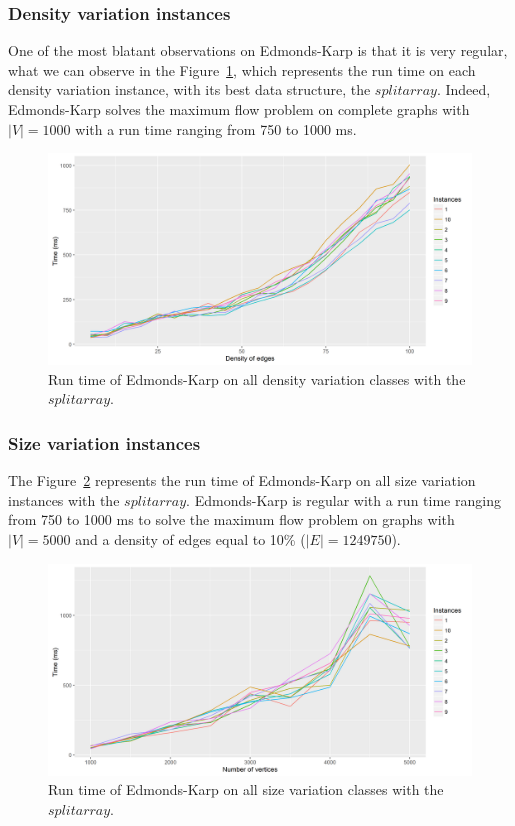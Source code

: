 \subsubsection{Density variation instances}
One of the most blatant observations on Edmonds-Karp is that it is very regular, what we can observe in the Figure~\ref{fig:EKmean}, which represents the run time on each density variation instance, with its best data structure, the $split array$. Indeed, Edmonds-Karp solves the maximum flow problem on complete graphs with $|V|=1000$ with a run time ranging from 750 to 1000 ms.
\begin{figure}[H]
\begin{center}
\includegraphics[scale=0.6]{images/results/EKmean.png}
\caption{Run time of Edmonds-Karp on all density variation classes with the $split array$.}
\label{fig:EKmean}
\end{center}
\end{figure}
\subsubsection{Size variation instances}
The Figure~\ref{fig:EKmeansize} represents the run time of Edmonds-Karp on all size variation instances with the $split array$. Edmonds-Karp is regular with a run time ranging from 750 to 1000 ms to solve the maximum flow problem on graphs with $|V|=5000$ and a density of edges equal to 10\% ($|E|=1249750$).
\begin{figure}[H]
\begin{center}
\includegraphics[scale=0.55]{images/results/EKmeansize2.png}
\caption{Run time of Edmonds-Karp on all size variation classes with the $split array$.}
\label{fig:EKmeansize}
\end{center}
\end{figure}
